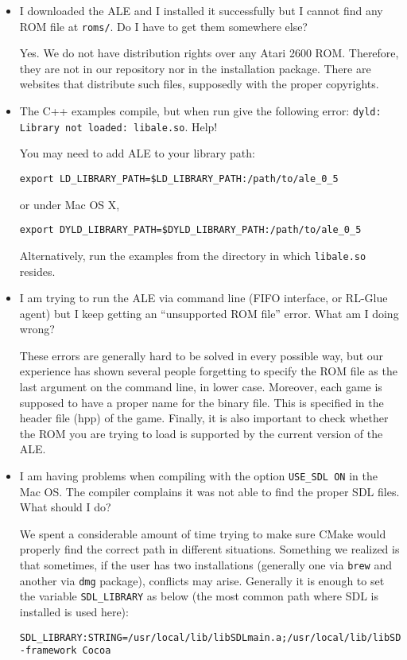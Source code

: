 \documentclass[12pt]{article}
\begin{document}
\begin{itemize}
\item I downloaded the ALE and I installed it successfully but I cannot find any ROM file at \verb+roms/+.
Do I have to get them somewhere else?

Yes. We do not have distribution rights over any Atari 2600 ROM. Therefore, they are not in our 
repository nor in the installation package. There are websites that distribute such files, supposedly
with the proper copyrights.

\item The C++ examples compile, but when run give the following error: \verb+dyld: Library not loaded: libale.so+. Help!

You may need to add ALE to your library path:

\begin{verbatim}
export LD_LIBRARY_PATH=$LD_LIBRARY_PATH:/path/to/ale_0_5
\end{verbatim}

or under Mac OS X,

\begin{verbatim}
export DYLD_LIBRARY_PATH=$DYLD_LIBRARY_PATH:/path/to/ale_0_5
\end{verbatim}

Alternatively, run the examples from the directory in which \verb+libale.so+ resides.


\item I am trying to run the ALE via command line (FIFO interface, or RL-Glue agent) but I keep 
getting an ``unsupported ROM file'' error. What am I doing wrong?

These errors are generally hard to be solved in every possible way, but our experience has shown 
several people forgetting to specify the ROM file as the last argument on the command line, in lower 
case. Moreover, each game is supposed to have a proper name for the binary file. This is specified 
in the header file (hpp) of the game. Finally, it is also important to check whether the ROM you are 
trying to load is supported by  the current  version of the ALE.

\item I am having problems when compiling with the option \verb+USE_SDL ON+ in the Mac OS.
The compiler complains it was not able to find the proper SDL files. What should I do?

We spent a considerable amount of time trying to make sure CMake would properly find the correct 
path in different situations. Something we realized is that sometimes, if the user has two 
installations (generally one via \verb+brew+ and another via \verb+dmg+ package), conflicts may 
arise. Generally it is enough to set the variable \verb+SDL_LIBRARY+ as below (the most common
path where SDL is installed is used here):
\vspace{-0.3cm}
\begin{verbatim}
SDL_LIBRARY:STRING=/usr/local/lib/libSDLmain.a;/usr/local/lib/libSDL.dylib;
-framework Cocoa
\end{verbatim}


\end{itemize}
\end{document}
